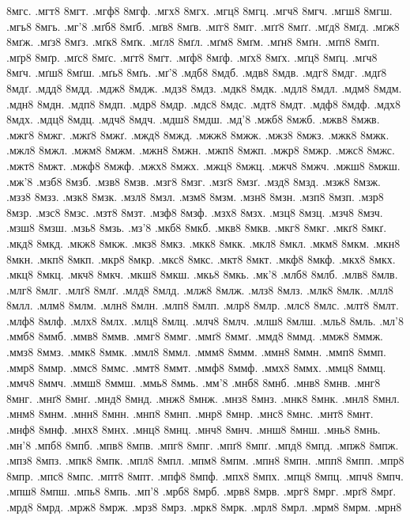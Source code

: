 {8мгс.
.мгт8
8мгт.
.мгф8
8мгф.
.мгх8
8мгх.
.мгц8
8мгц.
.мгч8
8мгч.
.мгш8
8мгш.
.мгь8
8мгь.
.мг'8
.мґб8
8мґб.
.мґв8
8мґв.
.мґг8
8мґг.
.мґґ8
8мґґ.
.мґд8
8мґд.
.мґж8
8мґж.
.мґз8
8мґз.
.мґк8
8мґк.
.мґл8
8мґл.
.мґм8
8мґм.
.мґн8
8мґн.
.мґп8
8мґп.
.мґр8
8мґр.
.мґс8
8мґс.
.мґт8
8мґт.
.мґф8
8мґф.
.мґх8
8мґх.
.мґц8
8мґц.
.мґч8
8мґч.
.мґш8
8мґш.
.мґь8
8мґь.
.мґ'8
.мдб8
8мдб.
.мдв8
8мдв.
.мдг8
8мдг.
.мдґ8
8мдґ.
.мдд8
8мдд.
.мдж8
8мдж.
.мдз8
8мдз.
.мдк8
8мдк.
.мдл8
8мдл.
.мдм8
8мдм.
.мдн8
8мдн.
.мдп8
8мдп.
.мдр8
8мдр.
.мдс8
8мдс.
.мдт8
8мдт.
.мдф8
8мдф.
.мдх8
8мдх.
.мдц8
8мдц.
.мдч8
8мдч.
.мдш8
8мдш.
.мд'8
.мжб8
8мжб.
.мжв8
8мжв.
.мжг8
8мжг.
.мжґ8
8мжґ.
.мжд8
8мжд.
.мжж8
8мжж.
.мжз8
8мжз.
.мжк8
8мжк.
.мжл8
8мжл.
.мжм8
8мжм.
.мжн8
8мжн.
.мжп8
8мжп.
.мжр8
8мжр.
.мжс8
8мжс.
.мжт8
8мжт.
.мжф8
8мжф.
.мжх8
8мжх.
.мжц8
8мжц.
.мжч8
8мжч.
.мжш8
8мжш.
.мж'8
.мзб8
8мзб.
.мзв8
8мзв.
.мзг8
8мзг.
.мзґ8
8мзґ.
.мзд8
8мзд.
.мзж8
8мзж.
.мзз8
8мзз.
.мзк8
8мзк.
.мзл8
8мзл.
.мзм8
8мзм.
.мзн8
8мзн.
.мзп8
8мзп.
.мзр8
8мзр.
.мзс8
8мзс.
.мзт8
8мзт.
.мзф8
8мзф.
.мзх8
8мзх.
.мзц8
8мзц.
.мзч8
8мзч.
.мзш8
8мзш.
.мзь8
8мзь.
.мз'8
.мкб8
8мкб.
.мкв8
8мкв.
.мкг8
8мкг.
.мкґ8
8мкґ.
.мкд8
8мкд.
.мкж8
8мкж.
.мкз8
8мкз.
.мкк8
8мкк.
.мкл8
8мкл.
.мкм8
8мкм.
.мкн8
8мкн.
.мкп8
8мкп.
.мкр8
8мкр.
.мкс8
8мкс.
.мкт8
8мкт.
.мкф8
8мкф.
.мкх8
8мкх.
.мкц8
8мкц.
.мкч8
8мкч.
.мкш8
8мкш.
.мкь8
8мкь.
.мк'8
.млб8
8млб.
.млв8
8млв.
.млг8
8млг.
.млґ8
8млґ.
.млд8
8млд.
.млж8
8млж.
.млз8
8млз.
.млк8
8млк.
.млл8
8млл.
.млм8
8млм.
.млн8
8млн.
.млп8
8млп.
.млр8
8млр.
.млс8
8млс.
.млт8
8млт.
.млф8
8млф.
.млх8
8млх.
.млц8
8млц.
.млч8
8млч.
.млш8
8млш.
.мль8
8мль.
.мл'8
.ммб8
8ммб.
.ммв8
8ммв.
.ммг8
8ммг.
.ммґ8
8ммґ.
.ммд8
8ммд.
.ммж8
8ммж.
.ммз8
8ммз.
.ммк8
8ммк.
.ммл8
8ммл.
.ммм8
8ммм.
.ммн8
8ммн.
.ммп8
8ммп.
.ммр8
8ммр.
.ммс8
8ммс.
.ммт8
8ммт.
.ммф8
8ммф.
.ммх8
8ммх.
.ммц8
8ммц.
.ммч8
8ммч.
.ммш8
8ммш.
.ммь8
8ммь.
.мм'8
.мнб8
8мнб.
.мнв8
8мнв.
.мнг8
8мнг.
.мнґ8
8мнґ.
.мнд8
8мнд.
.мнж8
8мнж.
.мнз8
8мнз.
.мнк8
8мнк.
.мнл8
8мнл.
.мнм8
8мнм.
.мнн8
8мнн.
.мнп8
8мнп.
.мнр8
8мнр.
.мнс8
8мнс.
.мнт8
8мнт.
.мнф8
8мнф.
.мнх8
8мнх.
.мнц8
8мнц.
.мнч8
8мнч.
.мнш8
8мнш.
.мнь8
8мнь.
.мн'8
.мпб8
8мпб.
.мпв8
8мпв.
.мпг8
8мпг.
.мпґ8
8мпґ.
.мпд8
8мпд.
.мпж8
8мпж.
.мпз8
8мпз.
.мпк8
8мпк.
.мпл8
8мпл.
.мпм8
8мпм.
.мпн8
8мпн.
.мпп8
8мпп.
.мпр8
8мпр.
.мпс8
8мпс.
.мпт8
8мпт.
.мпф8
8мпф.
.мпх8
8мпх.
.мпц8
8мпц.
.мпч8
8мпч.
.мпш8
8мпш.
.мпь8
8мпь.
.мп'8
.мрб8
8мрб.
.мрв8
8мрв.
.мрг8
8мрг.
.мрґ8
8мрґ.
.мрд8
8мрд.
.мрж8
8мрж.
.мрз8
8мрз.
.мрк8
8мрк.
.мрл8
8мрл.
.мрм8
8мрм.
.мрн8
}
